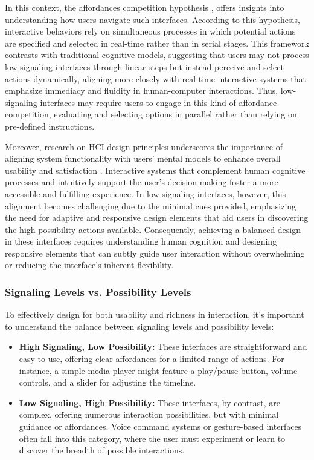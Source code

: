 In this context, the affordances competition hypothesis \cite{cisek2010neural}, offers insights into understanding how users navigate such interfaces.
According to this hypothesis, interactive behaviors rely on simultaneous processes in which potential actions are specified and selected in real-time rather than in serial stages.
This framework contrasts with traditional cognitive models, suggesting that users may not process low-signaling interfaces through linear steps but instead perceive and select actions dynamically, aligning more closely with real-time interactive systems that emphasize immediacy and fluidity in human-computer interactions.
Thus, low-signaling interfaces may require users to engage in this kind of affordance competition, evaluating and selecting options in parallel rather than relying on pre-defined instructions.

Moreover, research on HCI design principles underscores the importance of aligning system functionality with users' mental models to enhance overall usability and satisfaction \cite{10.1051/e3sconf/202339904037}.
Interactive systems that complement human cognitive processes and intuitively support the user's decision-making foster a more accessible and fulfilling experience.
In low-signaling interfaces, however, this alignment becomes challenging due to the minimal cues provided, emphasizing the need for adaptive and responsive design elements that aid users in discovering the high-possibility actions available.
Consequently, achieving a balanced design in these interfaces requires understanding human cognition and designing responsive elements that can subtly guide user interaction without overwhelming or reducing the interface’s inherent flexibility.

\subsubsection{ Signaling Levels vs. Possibility Levels}

To effectively design for both usability and richness in interaction, it's important to understand the balance between signaling levels and possibility levels:

\begin{itemize}
    \item \textbf{High Signaling, Low Possibility:} These interfaces are straightforward and easy to use, offering clear affordances for a limited range of actions.
    For instance, a simple media player might feature a play/pause button, volume controls, and a slider for adjusting the timeline.%
    
    \item \textbf{Low Signaling, High Possibility:} These interfaces, by contrast, are complex, offering numerous interaction possibilities, but with minimal guidance or affordances.
    Voice command systems or gesture-based interfaces often fall into this category, where the user must experiment or learn to discover the breadth of possible interactions.

\end{itemize}
    


